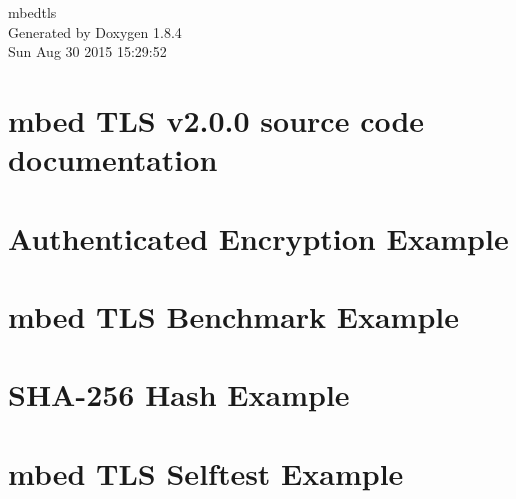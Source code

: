 \documentclass[twoside]{book}
\newcommand{\clearemptydoublepage}{%
  \newpage{\pagestyle{empty}\cleardoublepage}%
}
\begin{document}
\hypersetup{pageanchor=false}
\begin{titlepage}
\vspace*{7cm}
\begin{center}%
{\Large mbedtls }\\
\vspace*{1cm}
{\large Generated by Doxygen 1.8.4}\\
\vspace*{0.5cm}
{\small Sun Aug 30 2015 15:29:52}\\
\end{center}
\end{titlepage}
\clearemptydoublepage
\tableofcontents
\clearemptydoublepage
{}
\hypersetup{pageanchor=true}

\chapter{mbed T\-L\-S v2.0.0 source code documentation}
\label{index}\hypertarget{index}{}
\chapter{Authenticated Encryption Example}
\label{md_C:_dev2_luambedtls_dependencies_mbedtls_yotta_data_example-authcrypt_README}
\hypertarget{md_C:_dev2_luambedtls_dependencies_mbedtls_yotta_data_example-authcrypt_README}{}

\chapter{mbed T\-L\-S Benchmark Example}
\label{md_C:_dev2_luambedtls_dependencies_mbedtls_yotta_data_example-benchmark_README}
\hypertarget{md_C:_dev2_luambedtls_dependencies_mbedtls_yotta_data_example-benchmark_README}{}

\chapter{S\-H\-A-\/256 Hash Example}
\label{md_C:_dev2_luambedtls_dependencies_mbedtls_yotta_data_example-hashing_README}
\hypertarget{md_C:_dev2_luambedtls_dependencies_mbedtls_yotta_data_example-hashing_README}{}

\chapter{mbed T\-L\-S Selftest Example}
\label{md_C:_dev2_luambedtls_dependencies_mbedtls_yotta_data_example-selftest_README}
\hypertarget{md_C:_dev2_luambedtls_dependencies_mbedtls_yotta_data_example-selftest_README}{}

\end{document}
